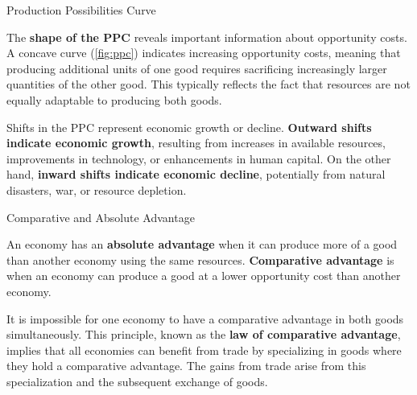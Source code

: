 \documentclass[10pt]{article}
\begin{document}
\begin{core}[label=core:ppc]{Production Possibilities Curve}
\begin{enumerate}
    \end{enumerate}

    The \textbf{shape of the PPC} reveals important information about opportunity costs. A concave curve (\autoref{fig:ppc}) indicates increasing opportunity costs, meaning that producing additional units of one good requires sacrificing increasingly larger quantities of the other good. This typically reflects the fact that resources are not equally adaptable to producing both goods.

    Shifts in the PPC represent economic growth or decline. \textbf{Outward shifts indicate economic growth}, resulting from increases in available resources, improvements in technology, or enhancements in human capital. On the other hand, \textbf{inward shifts indicate economic decline}, potentially from natural disasters, war, or resource depletion.

  \end{core}

  \begin{core}{Comparative and Absolute Advantage}

    An economy has an \textbf{absolute advantage} when it can produce more of a good than another economy using the same resources. \textbf{Comparative advantage} is when an economy can produce a good at a lower opportunity cost than another economy.

    It is impossible for one economy to have a comparative advantage in both goods simultaneously. This principle, known as the \textbf{law of comparative advantage}, implies that all economies can benefit from trade by specializing in goods where they hold a comparative advantage. The gains from trade arise from this specialization and the subsequent exchange of goods.
    
  \end{core}
\end{document}
